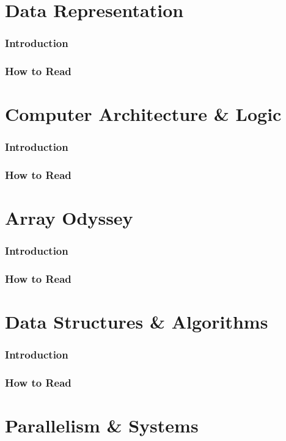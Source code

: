 \documentclass[12pt, oneside, openany]{book}
\begin{document}
	
    \frontmatter
    \frontmatterpagenumber
    
    
	\tableofcontents
    
	
    

\mainmatter
\mainmatterpagenumber
\part{Data Representation}
\section*{Introduction}
\section*{How to Read}
\part{Computer Architecture \& Logic}
\section*{Introduction}
\section*{How to Read}
\part{Array Odyssey}
\section*{Introduction}
\section*{How to Read}
\part{Data Structures \& Algorithms}
\section*{Introduction}
\section*{How to Read}
\part{Parallelism \& Systems}
\end{document}
